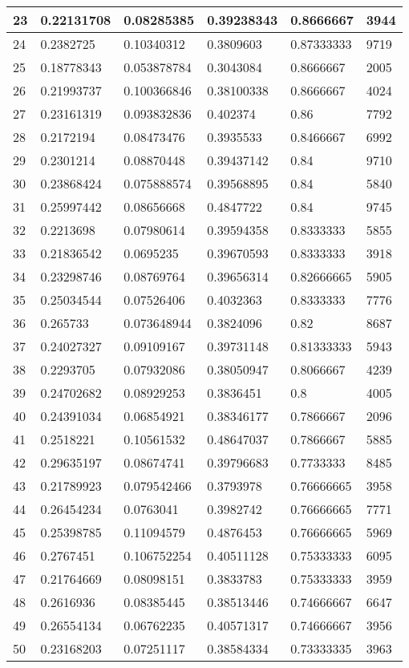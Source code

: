 \begin{longtable}{|l|l|l|l|l|l|}
23 & 0.22131708 & 0.08285385 & 0.39238343 & 0.8666667 & 3944 \\ \hline 
24 & 0.2382725 & 0.10340312 & 0.3809603 & 0.87333333 & 9719 \\ \hline 
25 & 0.18778343 & 0.053878784 & 0.3043084 & 0.8666667 & 2005 \\ \hline 
26 & 0.21993737 & 0.100366846 & 0.38100338 & 0.8666667 & 4024 \\ \hline 
27 & 0.23161319 & 0.093832836 & 0.402374 & 0.86 & 7792 \\ \hline 
28 & 0.2172194 & 0.08473476 & 0.3935533 & 0.8466667 & 6992 \\ \hline 
29 & 0.2301214 & 0.08870448 & 0.39437142 & 0.84 & 9710 \\ \hline 
30 & 0.23868424 & 0.075888574 & 0.39568895 & 0.84 & 5840 \\ \hline 
31 & 0.25997442 & 0.08656668 & 0.4847722 & 0.84 & 9745 \\ \hline 
32 & 0.2213698 & 0.07980614 & 0.39594358 & 0.8333333 & 5855 \\ \hline 
33 & 0.21836542 & 0.0695235 & 0.39670593 & 0.8333333 & 3918 \\ \hline 
34 & 0.23298746 & 0.08769764 & 0.39656314 & 0.82666665 & 5905 \\ \hline 
35 & 0.25034544 & 0.07526406 & 0.4032363 & 0.8333333 & 7776 \\ \hline 
36 & 0.265733 & 0.073648944 & 0.3824096 & 0.82 & 8687 \\ \hline 
37 & 0.24027327 & 0.09109167 & 0.39731148 & 0.81333333 & 5943 \\ \hline 
38 & 0.2293705 & 0.07932086 & 0.38050947 & 0.8066667 & 4239 \\ \hline 
39 & 0.24702682 & 0.08929253 & 0.3836451 & 0.8 & 4005 \\ \hline 
40 & 0.24391034 & 0.06854921 & 0.38346177 & 0.7866667 & 2096 \\ \hline 
41 & 0.2518221 & 0.10561532 & 0.48647037 & 0.7866667 & 5885 \\ \hline 
42 & 0.29635197 & 0.08674741 & 0.39796683 & 0.7733333 & 8485 \\ \hline 
43 & 0.21789923 & 0.079542466 & 0.3793978 & 0.76666665 & 3958 \\ \hline 
44 & 0.26454234 & 0.0763041 & 0.3982742 & 0.76666665 & 7771 \\ \hline 
45 & 0.25398785 & 0.11094579 & 0.4876453 & 0.76666665 & 5969 \\ \hline 
46 & 0.2767451 & 0.106752254 & 0.40511128 & 0.75333333 & 6095 \\ \hline 
47 & 0.21764669 & 0.08098151 & 0.3833783 & 0.75333333 & 3959 \\ \hline 
48 & 0.2616936 & 0.08385445 & 0.38513446 & 0.74666667 & 6647 \\ \hline 
49 & 0.26554134 & 0.06762235 & 0.40571317 & 0.74666667 & 3956 \\ \hline 
50 & 0.23168203 & 0.07251117 & 0.38584334 & 0.73333335 & 3963 \\ \hline 
\end{longtable}